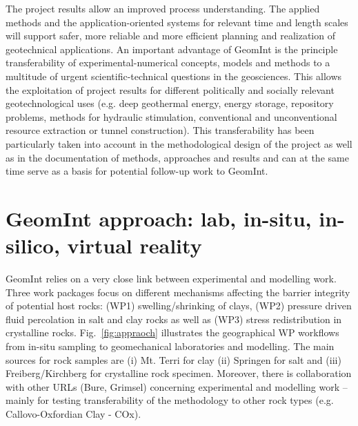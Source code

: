 The project results allow an improved process understanding. The applied methods and the application-oriented systems for relevant time and length scales will support safer, more reliable and more efficient planning and realization of geotechnical applications. An important advantage of GeomInt is the principle transferability of experimental-numerical concepts, models and methods to a multitude of urgent scientific-technical questions in the geosciences. This allows the exploitation of project results for different politically and socially relevant geotechnological uses (e.g. deep geothermal energy, energy storage, repository problems, methods for hydraulic stimulation, conventional and unconventional resource extraction or tunnel construction). This transferability has been particularly taken into account in the methodological design of the project as well as in the documentation of methods, approaches and results and can at the same time serve as a basis for potential follow-up work to GeomInt.

\section{GeomInt approach: lab, in-situ, in-silico, virtual reality}

GeomInt relies on a very close link between experimental and modelling work. Three work packages focus on different mechanisms affecting the barrier integrity of potential host rocks: (WP1) swelling/shrinking of clays, (WP2) pressure driven fluid percolation in salt and clay rocks as well as (WP3) stress redistribution in crystalline rocks.
%
Fig.~\ref{fig:appraoch} illustrates the geographical WP workflows from in-situ sampling to geomechanical laboratories and modelling. The main sources for rock samples are (i) Mt. Terri for clay (ii) Springen for salt and (iii) Freiberg/Kirchberg for crystalline rock specimen. Moreover, there is collaboration with other URLs (Bure, Grimsel) concerning experimental and modelling work -- mainly for testing transferability of the methodology to other rock types (e.g. Callovo-Oxfordian Clay - COx).

